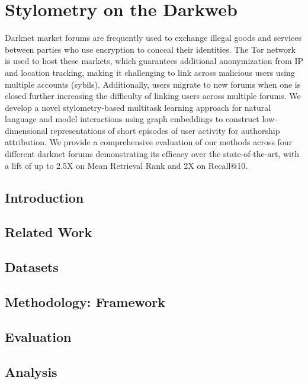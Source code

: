 \chapter{Stylometry on the Darkweb}
\label{chp:sysml}

Darknet market forums are frequently used to exchange illegal goods and services between parties who use encryption to conceal their identities. The Tor network is used to host these markets, which guarantees additional anonymization from IP and location tracking, making it challenging to link across malicious users using multiple accounts (sybils). Additionally, users migrate to new forums when one is closed further increasing the difficulty of linking users across multiple forums. We develop a novel stylometry-based multitask learning approach for natural language and model interactions using graph embeddings to construct low-dimensional representations of short episodes of user activity for authorship attribution. We provide a comprehensive evaluation of our methods across four different darknet forums demonstrating its efficacy over the state-of-the-art, with a lift of up to 2.5X on Mean Retrieval Rank and 2X on Recall@10.

\section{Introduction}


\section{Related Work}


\section{Datasets}


\section{Methodology: \SYSMLmethodname{} Framework}



\section{Evaluation}


\section{Analysis}


